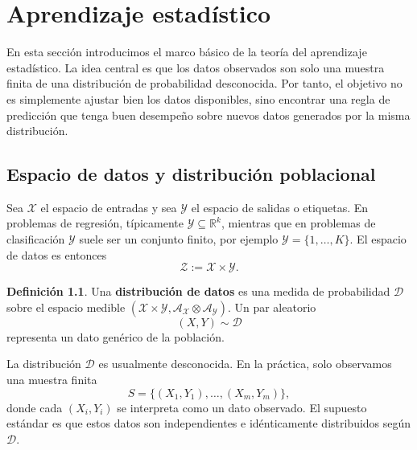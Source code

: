 \documentclass[11pt]{report}
\newenvironment{tcolorbox}[1][]{\par\medskip\noindent\ignorespaces}{\par\medskip}
\theoremstyle{definition}
\newtheorem{definicion}{Definición}[section]
\theoremstyle{plain}
\numberwithin{equation}{section}
\begin{document}
\chapter{Aprendizaje estadístico}

En esta sección introducimos el marco básico de la teoría del aprendizaje estadístico. La idea central es que los datos observados son solo una muestra finita de una distribución de probabilidad desconocida. Por tanto, el objetivo no es simplemente ajustar bien los datos disponibles, sino encontrar una regla de predicción que tenga buen desempeño sobre nuevos datos generados por la misma distribución.

\section{Espacio de datos y distribución poblacional}

Sea \(\mathcal{X}\) el espacio de entradas y sea \(\mathcal{Y}\) el espacio de salidas o etiquetas. En problemas de regresión, típicamente \(\mathcal{Y}\subseteq\mathbb{R}^k\), mientras que en problemas de clasificación \(\mathcal{Y}\) suele ser un conjunto finito, por ejemplo \(\mathcal{Y}=\{1,\ldots,K\}\). El espacio de datos es entonces
\begin{equation*}
    \mathcal{Z}:=\mathcal{X}\times\mathcal{Y}.
\end{equation*}

\begin{tcolorbox}[colback=blue!8, colframe=blue!8, boxrule=0pt]
\begin{definicion}
Una \textbf{distribución de datos} es una medida de probabilidad \(\mathcal{D}\) sobre el espacio medible \((\mathcal{X}\times\mathcal{Y},\mathcal{A}_{\mathcal{X}}\otimes\mathcal{A}_{\mathcal{Y}})\). Un par aleatorio
\begin{equation*}
    (X,Y)\sim\mathcal{D}
\end{equation*}
representa un dato genérico de la población.
\end{definicion}
\end{tcolorbox}

La distribución \(\mathcal{D}\) es usualmente desconocida. En la práctica, solo observamos una muestra finita
\begin{equation*}
    S=\{(X_1,Y_1),\ldots,(X_m,Y_m)\},
\end{equation*}
donde cada \((X_i,Y_i)\) se interpreta como un dato observado. El supuesto estándar es que estos datos son independientes e idénticamente distribuidos según \(\mathcal{D}\).
\end{document}
